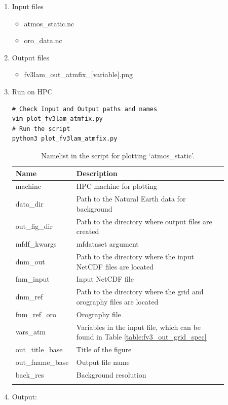 \documentclass[11pt,fleqn]{report}              %
\begin{document}
\begin{enumerate}
\item Input files
\begin{itemize}
\item atmos\_static.nc
\item oro\_data.nc
\end{itemize}
\item Output files
\begin{itemize}
\item fv3lam\_out\_atmfix\_[variable].png
\end{itemize}
\item Run on HPC

\lstset{language=bash}   
\begin{lstlisting}[frame=trBL]
# Check Input and Output paths and names
vim plot_fv3lam_atmfix.py
# Run the script
python3 plot_fv3lam_atmfix.py
\end{lstlisting}

{
\fontsize{10}{12}\selectfont
\begin{longtable}{p{0.17\linewidth} | p{0.7\linewidth} }
\hline
\hline
 Name & Description \\
\hline
 machine & HPC machine for plotting \\
 data\_dir & Path to the Natural Earth data for background \\
 out\_fig\_dir & Path to the directory where output files are created \\
 mfdf\_kwargs & mfdataset argument \\
 dnm\_out & Path to the directory where the input NetCDF files are located   \\
 fnm\_input & Input NetCDF file \\
 dnm\_ref & Path to the directory where the grid and orography files are located \\
 fnm\_ref\_oro & Orography file \\
 vars\_atm & Variables in the input file, which can be found in Table \ref{table:fv3_out_grid_spec}\\
 out\_title\_base & Title of the figure \\
 out\_fname\_base & Output file name \\
 back\_res & Background resolution \\
\hline
\caption{Namelist in the script for plotting `atmos\_static'.}
\label{table:fv3_var_atmosstatic}
\end{longtable}
}


\item Output:


\end{enumerate}
\end{document}
